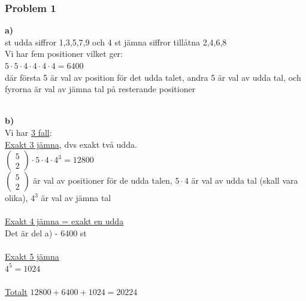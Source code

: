 \documentclass{article}
\begin{document}
            \subsubsection{Problem 1}
                \begin{tabbing}
                    \indent \textbf{a)}\hspace{5pt}\=\\
                     st udda siffror 1,3,5,7,9 och 4 st jämna siffror tillåtna 2,4,6,8\\
                    \>Vi har fem positioner vilket ger:\\
                    \>$5\cdot 5\cdot 4\cdot 4\cdot 4\cdot 4=6400$\\
                    \>där första 5 är val av position för det udda talet, andra 5 är val av udda tal, och fyrorna är val av jämna tal på resterande positioner\\\\
                \end{tabbing}

                \begin{tabbing}
                    \indent \textbf{b)}\hspace{5pt}\=\\
                    \>Vi har \underline{3 fall}:\\
                    \>\underline{Exakt 3 jämna}, dvs exakt två udda.\\
                    \>$\begin{pmatrix}5\\2\end{pmatrix}\cdot 5\cdot 4\cdot 4^{3}=12800$\\
                    \>$\begin{pmatrix}5\\2\end{pmatrix}$ är val av positioner för de udda talen, 
                    $5\cdot 4$ är val av udda tal (skall vara olika), 
                    $4^{3}$ är val av jämna tal\\\\
                    \>\underline{Exakt 4 jämna = exakt en udda}\\
                    \>Det är del a) - 6400 st\\\\
                    \>\underline{Exakt 5 jämna}\\
                    \>$4^{5}=1024$\\\\
                    \>\underline{Totalt} $12800+6400+1024=20224$
                \end{tabbing}
            
\end{document}
